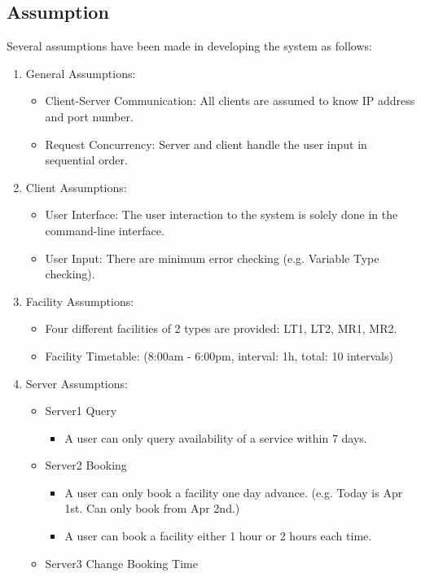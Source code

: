 \begin{spacing}{1}
\section{Assumption}
Several assumptions have been made in developing the system as follows:
\begin{enumerate}
   \item General Assumptions:
   \begin{itemize}
      \item Client-Server Communication: All clients are assumed to know IP address and port number.
      \item Request Concurrency: Server and client handle the user input in sequential order. 
   \end{itemize}
   \item Client Assumptions:
      \begin{itemize}
      \item User Interface: The user interaction to the system is solely done in the command-line interface.
      \item User Input: There are minimum error checking (e.g. Variable Type checking). 
   \end{itemize}
    \item Facility Assumptions:
        \begin{itemize}
      \item Four different facilities of 2 types are provided: LT1, LT2, MR1, MR2.
      \item Facility Timetable: (8:00am - 6:00pm, interval: 1h, total: 10 intervals)
   \end{itemize}
    \item Server Assumptions:
        \begin{itemize}
      \item Server1 Query
        \begin{itemize}
            \item A user can only query availability of a service within 7 days.
        \end{itemize}
      \item Server2 Booking
      \begin{itemize}
          \item  A user can only book a facility one day advance. (e.g. Today is Apr 1st. Can only book from Apr 2nd.)
          \item A user can book a facility either 1 hour or 2 hours each time.
      \end{itemize}
        \item Server3 Change Booking Time

\end{itemize}
\end{enumerate}
\end{spacing}
